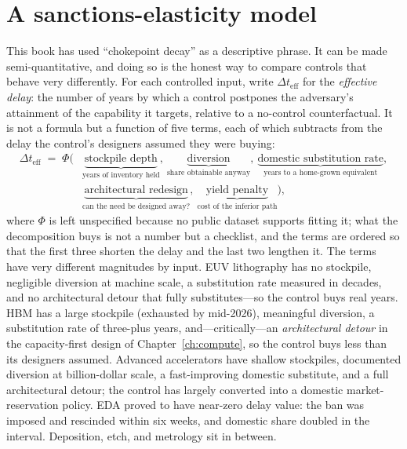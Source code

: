 \section{A sanctions-elasticity model}
\label{sec:elasticity}

This book has used ``chokepoint decay'' as a descriptive phrase. It can be made semi-quantitative, and doing so is the honest way to compare controls that behave very differently. For each controlled input, write $\Delta t_{\text{eff}}$ for the \emph{effective delay}: the number of years by which a control postpones the adversary's attainment of the capability it targets, relative to a no-control counterfactual. It is not a formula but a function of five terms, each of which subtracts from the delay the control's designers assumed they were buying:
\begin{align*}
\Delta t_{\text{eff}} \;=\; \Phi\big(&\underbrace{\text{stockpile depth}}_{\text{years of inventory held}},\ \underbrace{\text{diversion}}_{\text{share obtainable anyway}},\ \underbrace{\text{domestic substitution rate}}_{\text{years to a home-grown equivalent}},\\
 &\underbrace{\text{architectural redesign}}_{\text{can the need be designed away?}},\ \underbrace{\text{yield penalty}}_{\text{cost of the inferior path}}\big),
\end{align*}
where $\Phi$ is left unspecified because no public dataset supports fitting it; what the decomposition buys is not a number but a checklist, and the terms are ordered so that the first three shorten the delay and the last two lengthen it. The terms have very different magnitudes by input. EUV lithography has no stockpile, negligible diversion at machine scale, a substitution rate measured in decades, and no architectural detour that fully substitutes---so the control buys real years. HBM has a large stockpile (exhausted by mid-2026), meaningful diversion, a substitution rate of three-plus years, and---critically---an \emph{architectural detour} in the capacity-first design of Chapter~\ref{ch:compute}, so the control buys less than its designers assumed. Advanced accelerators have shallow stockpiles, documented diversion at billion-dollar scale, a fast-improving domestic substitute, and a full architectural detour; the control has largely converted into a domestic market-reservation policy. EDA proved to have near-zero delay value: the ban was imposed and rescinded within six weeks, and domestic share doubled in the interval. Deposition, etch, and metrology sit in between.

